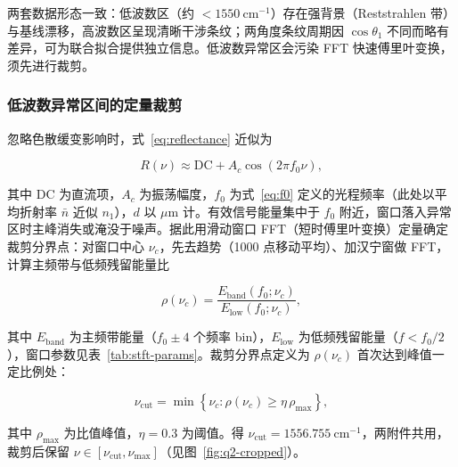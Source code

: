 \documentclass[withoutpreface,bwprint]{cumcmthesis}
\begin{document}
两套数据形态一致：低波数区（约 $<1550\ \mathrm{cm^{-1}}$）存在强背景（Reststrahlen 带）与基线漂移，高波数区呈现清晰干涉条纹；两角度条纹周期因 $\cos\theta_1$ 不同而略有差异，可为联合拟合提供独立信息。低波数异常区会污染 FFT 快速傅里叶变换，须先进行裁剪。

\subsubsection{低波数异常区间的定量裁剪}

忽略色散缓变影响时，式~\eqref{eq:reflectance} 近似为

\begin{equation}
R(\nu) \approx \mathrm{DC} + A_c\cos\left(2\pi f_0\nu\right),
\label{eq:fft-freq}
\end{equation}

其中 $\mathrm{DC}$ 为直流项，$A_c$ 为振荡幅度，$f_0$ 为式~\eqref{eq:f0} 定义的光程频率（此处以平均折射率 $\bar n$ 近似 $n_1$），$d$ 以 $\mu$m 计。有效信号能量集中于 $f_0$ 附近，窗口落入异常区时主峰消失或淹没于噪声。据此用滑动窗口 FFT（短时傅里叶变换）定量确定裁剪分界点：对窗口中心 $\nu_c$，先去趋势（1000 点移动平均）、加汉宁窗做 FFT，计算主频带与低频残留能量比

\begin{equation}
\rho(\nu_c) = \frac{E_{\mathrm{band}}(f_0;\nu_c)}{E_{\mathrm{low}}(f_0;\nu_c)},
\label{eq:stft-ratio}
\end{equation}

其中 $E_{\mathrm{band}}$ 为主频带能量（$f_0\pm4$ 个频率 bin），$E_{\mathrm{low}}$ 为低频残留能量（$f<f_0/2$），窗口参数见表~\ref{tab:stft-params}。裁剪分界点定义为 $\rho(\nu_c)$ 首次达到峰值一定比例处：

\begin{equation}
\nu_{\mathrm{cut}} = \min\left\{ \nu_c : \rho(\nu_c) \ge \eta\,\rho_{\max} \right\},
\label{eq:cutoff}
\end{equation}

其中 $\rho_{\max}$ 为比值峰值，$\eta=0.3$ 为阈值。得 $\nu_{\mathrm{cut}}=\mathbf{1556.755\ \mathrm{cm^{-1}}}$，两附件共用，裁剪后保留 $\nu\in[\nu_{\mathrm{cut}},\nu_{\max}]$（见图~\ref{fig:q2-cropped}）。
\end{document}
